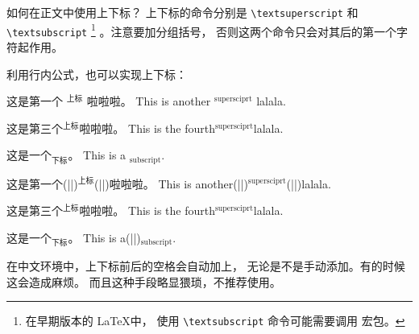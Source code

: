 \begin{myQA}{如何在正文中使用上下标？}
	上下标的命令分别是 \verb|\textsuperscript|
	和 \verb|\textsubscript|
	\footnote{在早期版本的 \LaTeX 中，
		使用 \verb|\textsubscript| 命令可能需要调用
		  宏包。}
	。注意要加分组括号，
	否则这两个命令只会对其后的第一个字符起作用。
	
	利用行内公式，也可以实现上下标：
\begin{myExampleV}
{
	\vspace{1 ex}
	
	这是第一个 $^\text{上标}$ 啦啦啦。
	This is another $^\text{supersciprt}$ lalala.
	
	这是第三个$^\text{上标}$啦啦啦。
	This is the fourth$^\text{supersciprt}$lalala.
	
	这是一个$_\text{下标}$。
	This is a $_\text{subscript}$.
}
这是第一个(|\textvisiblespace|)$^\text{上标}$(|\textvisiblespace|)啦啦啦。
This is another(|\textvisiblespace|)$^\text{supersciprt}$(|\textvisiblespace|)lalala.

这是第三个$^\text{上标}$啦啦啦。
This is the fourth$^\text{supersciprt}$lalala.

这是一个$_\text{下标}$。
This is a(|\textvisiblespace|)$_\text{subscript}$.
\end{myExampleV}
	在中文环境中，上下标前后的空格会自动加上，
	无论是不是手动添加。有的时候这会造成麻烦。
	而且这种手段略显猥琐，不推荐使用。
	
\end{myQA}
